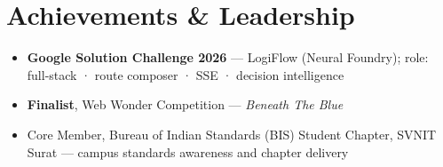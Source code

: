 \documentclass[a4paper,10pt]{article}
\begin{document}
\section{Achievements \& Leadership}
\begin{itemize}
  \item \textbf{Google Solution Challenge 2026} --- LogiFlow (Neural Foundry); role: full-stack · route composer · SSE · decision intelligence
  \item \textbf{Finalist}, Web Wonder Competition --- \textit{Beneath The Blue}
  \item Core Member, Bureau of Indian Standards (BIS) Student Chapter, SVNIT Surat --- campus standards awareness and chapter delivery
\end{itemize}
\end{document}
